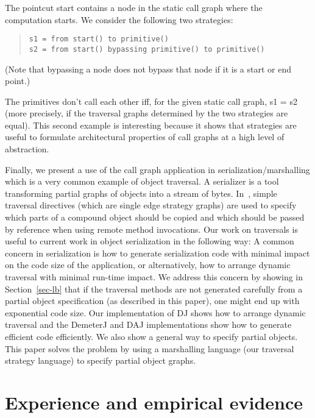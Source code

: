 \begin{itemize}
The pointcut {\sf start} contains a node in the static call graph
where the computation starts.  We consider the following two
strategies:
\begin{quote}
\begin{verbatim}
s1 = from start() to primitive()
s2 = from start() bypassing primitive() to primitive()
\end{verbatim}
\end{quote}
(Note that bypassing a node does not bypass that node if it is a
start or end point.)

The primitives don't call each other iff, for the given static call
graph, {\sf s1 = s2} (more precisely, if the traversal graphs
determined by the two strategies are equal).  This second example is
interesting because it shows that strategies are useful to formulate
architectural properties of call graphs at a high level of
abstraction.
\end{itemize}

Finally, we present a use of the call graph application in
serialization/marshalling which is a very common example of object
traversal.  A serializer is a tool transforming partial graphs of
objects into a stream of bytes.  In~\cite{Lopes96a}, simple traversal
directives (which are single edge strategy graphs) are used to specify
which parts of a compound object should be copied and which should be
passed by reference when using remote method invocations.  Our work on
traversals is useful to current work in object serialization
\cite{phillipsen:CPE,bartoli:SPE,hoschka:marshalling} in the following
way: A common concern in serialization is how to generate
serialization code with minimal impact on the code size of the
application, or alternatively, how to arrange dynamic traversal with
minimal run-time impact.  We address this concern by showing in
Section~\ref{sec-lb} that if the traversal methods are not generated
carefully from a partial object specification (as described in this
paper), one might end up with exponential code size.  Our
implementation of DJ shows how to arrange dynamic traversal and the
DemeterJ and DAJ implementations show how to generate efficient code
efficiently.  We also show a general way to specify partial objects.
This paper solves the problem by using a marshalling language (our
traversal strategy language) to specify partial object graphs.


\section{Experience and empirical evidence}
\label{sec-experience}

